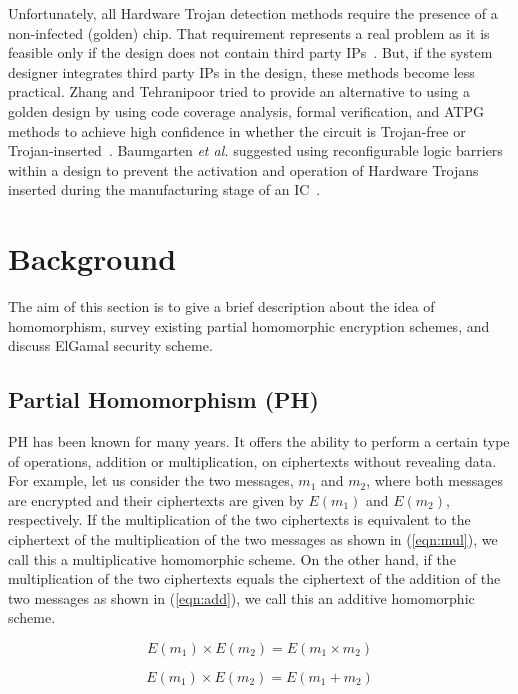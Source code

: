 \documentclass[conference]{IEEEtran}
\begin{document}
Unfortunately, all Hardware Trojan detection methods require the presence of a non-infected (golden) chip. That requirement represents a real problem as it is feasible only if the design does not contain third party IPs{\color{blue}~\cite{journal:Teh2011}}. But, if the system designer integrates third party IPs in the design, these methods become less practical. Zhang and Tehranipoor tried to provide an alternative to using a golden design by using code coverage analysis, formal verification, and ATPG methods to achieve high confidence in whether the circuit is Trojan-free or Trojan-inserted{\color{blue}~\cite{conf:zha2011}}. Baumgarten \textit{et al.} suggested using reconfigurable logic barriers within a design to prevent the activation and operation of Hardware Trojans inserted during the manufacturing stage of an IC{\color{blue}~\cite{journal:Bau2010}}. \section{Background} \label{sec:backgrnd}

The aim of this section is to give a brief description about the idea of homomorphism, survey existing partial homomorphic encryption schemes, and discuss ElGamal security scheme.

\subsection{Partial Homomorphism (PH)} \label{sub:Phomo}
PH has been known for many years. It offers the ability to perform a certain type of operations, addition or multiplication, on ciphertexts without revealing data. For example, let us consider the two messages, $m_1$ and $m_2$, where both messages are encrypted and their ciphertexts are given by $E(m_1)$ and $E(m_2)$, respectively. If the multiplication of the two ciphertexts is equivalent to the ciphertext of the multiplication of the two messages as shown in (\ref{eqn:mul}), we call this a multiplicative homomorphic scheme. On the other hand, if the multiplication of the two ciphertexts equals the ciphertext of the addition of the two messages as shown in (\ref{eqn:add}), we call this an additive homomorphic scheme. 

\begin{equation}
E(m_1) \times E(m_2) = E(m_1 \times m_2)
\label{eqn:mul}
\end{equation} 

\begin{equation}
E(m_1) \times E(m_2) = E(m_1 + m_2)
\label{eqn:add}
\end{equation} 
\end{document}
